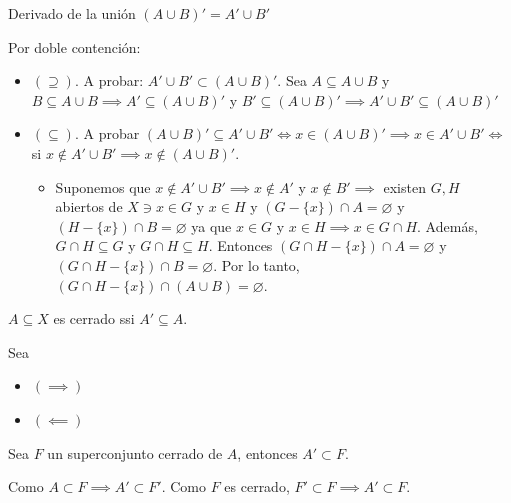 \begin{prop}
    Derivado de la unión $(A\cup B)'=A'\cup B' $
    \begin{dem}
        Por doble contención:
        \begin{itemize}
            \item $(\supseteq)$. A probar: $A'\cup B'\subset (A\cup B)'$. Sea $A\subseteq A\cup B$ y $B\subseteq A\cup B\implies A'\subseteq (A\cup B)'$ y $B'\subseteq (A\cup B)'\implies A'\cup B'\subseteq (A\cup B)'$
            \item $(\subseteq)$. A probar $(A\cup B)'\subseteq A'\cup B'\iff x\in (A\cup B)'\implies x\in A'\cup B'\iff$ si $x\not\in A'\cup B'\implies x\not\in (A\cup B)'$.
            \begin{itemize}
                \item Suponemos que $x\not\in A'\cup B'\implies x\not\in A'$ y $x\not\in B'\implies$ existen $G,H$ abiertos de $X\ni x\in G$ y $x\in H$ y $(G-\{x\})\cap A=\varnothing$ y $(H-\{x\})\cap B=\varnothing $ ya que $x\in G$ y $x\in H\implies x\in G\cap H$. Además, $G\cap H\subseteq G$ y $G\cap H\subseteq H$. Entonces $(G\cap H-\{x\})\cap A=\varnothing$ y $(G\cap H-\{x\})\cap B =\varnothing$. Por lo tanto, $(G\cap H-\{x\})\cap (A\cup B)=\varnothing$. 
            \end{itemize}
        \end{itemize}
    \end{dem}
\end{prop}
\begin{prop}
    $A\subseteq X$ es cerrado ssi $A'\subseteq A$.
    \begin{dem}
        Sea
        \begin{itemize}
            \item $(\implies)$
            \item $(\impliedby)$
        \end{itemize}
    \end{dem}
\end{prop}

\begin{prop}
    Sea $F$ un superconjunto cerrado de $A$, entonces $A'\subset F$. 
    \begin{dem}
        Como $A\subset F\implies A'\subset F'$. Como $F$ es cerrado, $F'\subset F\implies A'\subset F$.
    \end{dem}
\end{prop}

